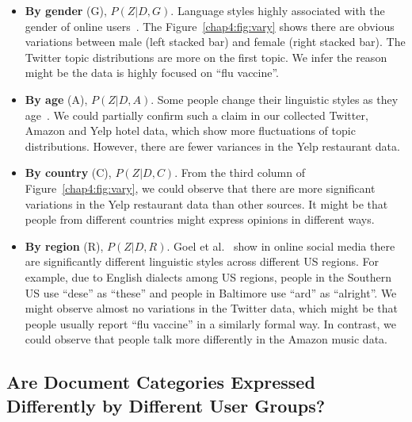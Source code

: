 \begin{itemize}
    \item \textbf{By gender} (G), $P(Z|D, G)$. Language styles highly associated with the gender of online users~\cite{hovy2018capturing}. The Figure~\ref{chap4:fig:vary} shows there are obvious variations between male (left stacked bar) and female (right stacked bar). The Twitter topic distributions are more on the first topic. We infer the reason might be the data is highly focused on ``flu vaccine''.
    \item \textbf{By age} (A), $P(Z|D, A)$. Some people change their linguistic styles as they age~\cite{wagner2012age}. We could partially confirm such a claim in our collected Twitter, Amazon and Yelp hotel data, which show more fluctuations of topic distributions. However, there are fewer variances in the Yelp restaurant data. 
    \item \textbf{By country} (C), $P(Z|D, C)$. From the third column of Figure~\ref{chap4:fig:vary}, we could observe that there are more significant variations in the Yelp restaurant data than other sources. It might be that people from different countries might express opinions in different ways. 
    \item \textbf{By region} (R), $P(Z|D, R)$. Goel et al.~\cite{goel2016social} show in online social media there are significantly different linguistic styles across different US regions. For example, due to English dialects among US regions, people in the Southern US use ``dese'' as ``these'' and people in Baltimore use ``ard'' as ``alright''. We might observe almost no variations in the Twitter data, which might be that people usually report ``flu vaccine'' in a similarly formal way. In contrast, we could observe that people talk more differently in the Amazon music data. 
\end{itemize}


\subsection{Are Document Categories Expressed Differently by Different User Groups?}

